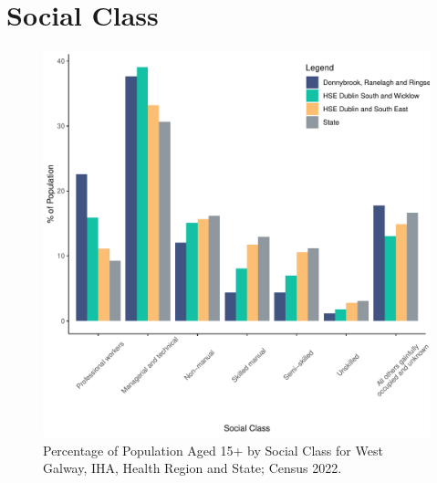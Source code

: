\documentclass{article}
\begin{document}
\section{Social Class}\label{sect:SC}
\begin{figure}[H]
	\centering
	\includegraphics[width = 140mm]{../figures/SocialClassED.pdf}
	\caption{Percentage of Population Aged 15+ by Social Class for West Galway, IHA, Health Region and State; Census 2022.}
	\label{fig:vbnv}
	\end{figure}
\end{document}
